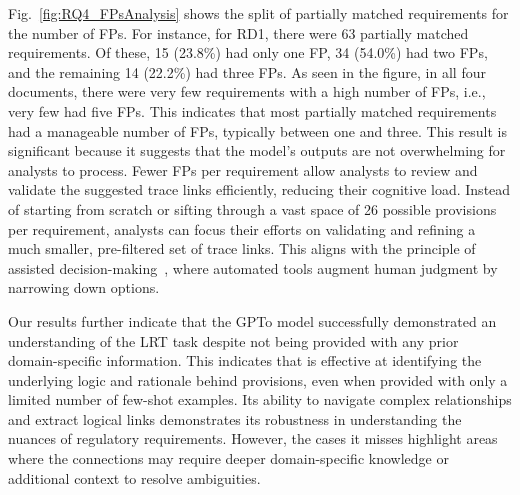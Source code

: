 Fig.~\ref{fig:RQ4_FPsAnalysis} shows the split of partially matched requirements for the number of FPs. For instance, for RD1, %
there were 63 partially matched requirements. Of these, 15 (23.8\%) had only one FP, 34 (54.0\%) had two FPs, and the remaining 14 (22.2\%) had three FPs. As seen in the figure, in all four documents, there were very few requirements with a high number of FPs, i.e., very few had five FPs. 
%
This indicates that most partially matched requirements had a manageable number of FPs, typically between one and three. This result is significant because it suggests that the model's outputs are not overwhelming for analysts to process. Fewer FPs per requirement allow analysts to review and validate the suggested trace links efficiently, reducing their cognitive load. Instead of starting from scratch or sifting through a vast space of 26 possible provisions per requirement, analysts can focus their efforts on validating and refining a much smaller, pre-filtered set of trace links. This aligns with the principle of assisted decision-making~\cite{skitka1999does}, where automated tools augment human judgment by narrowing down options. 

Our results further indicate that the GPTo model successfully demonstrated an understanding of the LRT task despite not being provided with any prior domain-specific information. This indicates that \RICE is effective at identifying the underlying logic and rationale behind provisions, even when provided with only a limited number of few-shot examples. Its ability to navigate complex relationships and extract logical links demonstrates its robustness in understanding the nuances of regulatory requirements. However, the cases it misses highlight areas where the connections may require deeper domain-specific knowledge or additional context to resolve ambiguities.

